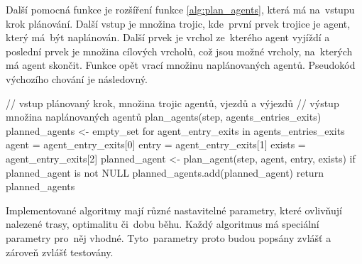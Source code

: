 Další pomocná funkce je rozšíření funkce \ref{alg:plan_agents}, která má na~vstupu krok plánování.
Další vstup je množina trojic, kde~první prvek trojice je agent, který má~být naplánován.
Další prvek je vrchol ze~kterého agent vyjíždí a
poslední prvek je množina cílových vrcholů, což jsou možné vrcholy, na~kterých má agent skončit.
Funkce opět vrací množinu naplánovaných agentů.
Pseudokód výchozího chování je následovný.
\begin{code}[fontsize=\footnotesize]
// vstup plánovaný krok, množina trojic agentů, vjezdů a výjezdů
// výstup množina naplánovaných agentů
plan_agents(step, agents_entries_exits)
  planned_agents <- empty_set
  for agent_entry_exits in agents_entries_exits
    agent = agent_entry_exits[0]
    entry = agent_entry_exits[1]
    exists = agent_entry_exits[2]
    planned_agent <- plan_agent(step, agent, entry, exists)
    if planned_agent is not NULL
      planned_agents.add(planned_agent)
  return planned_agents
\end{code}

Implementované algoritmy mají různé nastavitelné parametry, které ovlivňují nalezené trasy, optimalitu či~dobu běhu.
Každý algoritmus má speciální parametry pro~něj vhodné.
Tyto~parametry proto budou popsány zvlášť a zároveň zvlášť testovány.








